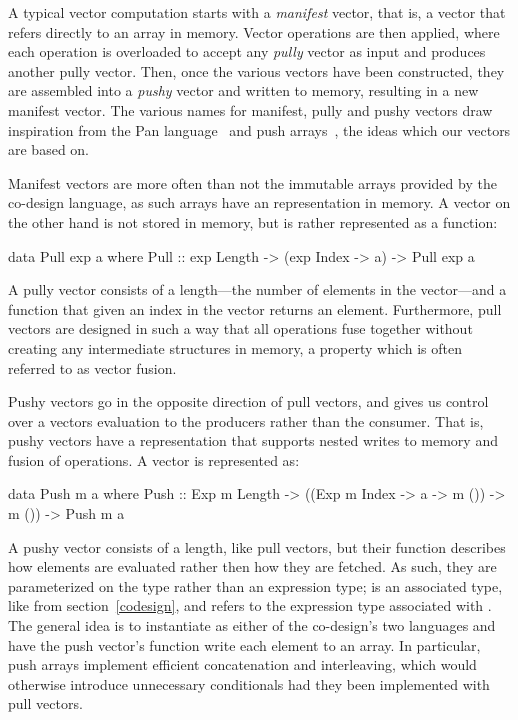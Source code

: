 \documentclass[../paper.tex]{subfiles}
\begin{document}
A typical vector computation starts with a \textit{manifest} vector, that is, a vector that refers directly to an array in memory. Vector operations are then applied, where each operation is overloaded to accept any \textit{pully} vector as input and produces another pully vector. Then, once the various vectors have been constructed, they are assembled into a \textit{pushy} vector and written to memory, resulting in a new manifest vector. The various names for manifest, pully and pushy vectors draw inspiration from the Pan language~\cite{elliott2003} and push arrays~\cite{claessen2012}, the ideas which our vectors are based on.

Manifest vectors are more often than not the immutable arrays provided by the co-design language, as such arrays have an representation in memory. A  vector on the other hand is not stored in memory, but is rather represented as a function:

\begin{code}
data Pull exp a where
  Pull :: exp Length -> (exp Index -> a) -> Pull exp a
\end{code}

\noindent A pully vector consists of a length---the number of elements in the vector---and a function that given an index in the vector returns an element. Furthermore, pull vectors are designed in such a way that all operations fuse together without creating any intermediate structures in memory, a property which is often referred to as vector fusion.

Pushy vectors go in the opposite direction of pull vectors, and gives us control over a vectors evaluation to the producers rather than the consumer. That is, pushy vectors have a representation that supports nested writes to memory and fusion of operations. A  vector is represented as:

\begin{code}
data Push m a where
  Push :: Exp m Length -> ((Exp m Index -> a -> m ()) -> m ()) -> Push m a
\end{code}

\noindent A pushy vector consists of a length, like pull vectors, but their function describes how elements are evaluated rather then how they are fetched. As such, they are parameterized on the type  rather than an expression type;  is an associated type, like  from section~\ref{codesign}, and refers to the expression type associated with . The general idea is to instantiate  as either of the co-design's two languages and have the push vector's function write each element to an array. In particular, push arrays implement efficient concatenation and interleaving, which would otherwise introduce unnecessary conditionals had they been implemented with pull vectors.
\end{document}
